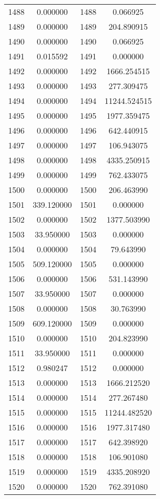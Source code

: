 \documentclass[12pt]{article}
\begin{document}
\begin{longtable}{@{}cccc@{}}
1488 & 0.000000 & 1488 & 0.066925 \\
1489 & 0.000000 & 1489 & 204.890915 \\
1490 & 0.000000 & 1490 & 0.066925 \\
1491 & 0.015592 & 1491 & 0.000000 \\
1492 & 0.000000 & 1492 & 1666.254515 \\
1493 & 0.000000 & 1493 & 277.309475 \\
1494 & 0.000000 & 1494 & 11244.524515 \\
1495 & 0.000000 & 1495 & 1977.359475 \\
1496 & 0.000000 & 1496 & 642.440915 \\
1497 & 0.000000 & 1497 & 106.943075 \\
1498 & 0.000000 & 1498 & 4335.250915 \\
1499 & 0.000000 & 1499 & 762.433075 \\
1500 & 0.000000 & 1500 & 206.463990 \\
1501 & 339.120000 & 1501 & 0.000000 \\
1502 & 0.000000 & 1502 & 1377.503990 \\
1503 & 33.950000 & 1503 & 0.000000 \\
1504 & 0.000000 & 1504 & 79.643990 \\
1505 & 509.120000 & 1505 & 0.000000 \\
1506 & 0.000000 & 1506 & 531.143990 \\
1507 & 33.950000 & 1507 & 0.000000 \\
1508 & 0.000000 & 1508 & 30.763990 \\
1509 & 609.120000 & 1509 & 0.000000 \\
1510 & 0.000000 & 1510 & 204.823990 \\
1511 & 33.950000 & 1511 & 0.000000 \\
1512 & 0.980247 & 1512 & 0.000000 \\
1513 & 0.000000 & 1513 & 1666.212520 \\
1514 & 0.000000 & 1514 & 277.267480 \\
1515 & 0.000000 & 1515 & 11244.482520 \\
1516 & 0.000000 & 1516 & 1977.317480 \\
1517 & 0.000000 & 1517 & 642.398920 \\
1518 & 0.000000 & 1518 & 106.901080 \\
1519 & 0.000000 & 1519 & 4335.208920 \\
1520 & 0.000000 & 1520 & 762.391080 \\

\end{longtable}
\end{document}
